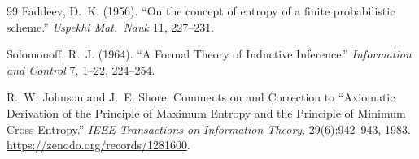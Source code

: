 \documentclass[11pt]{article}
\theoremstyle{definition}
\theoremstyle{remark}
\begin{document}
\begin{thebibliography}{99}
Faddeev, D.~K. (1956).
``On the concept of entropy of a finite probabilistic scheme.''
\emph{Uspekhi Mat.\ Nauk} 11, 227--231.

Solomonoff, R.~J. (1964).
``A Formal Theory of Inductive Inference.''
\emph{Information and Control} 7, 1--22, 224--254.

R.~W. Johnson and J.~E. Shore.
Comments on and Correction to ``Axiomatic Derivation of the Principle of Maximum Entropy and the Principle of Minimum Cross-Entropy.''
\emph{IEEE Transactions on Information Theory}, 29(6):942--943, 1983.
\url{https://zenodo.org/records/1281600}.

\end{thebibliography}
\end{document}
